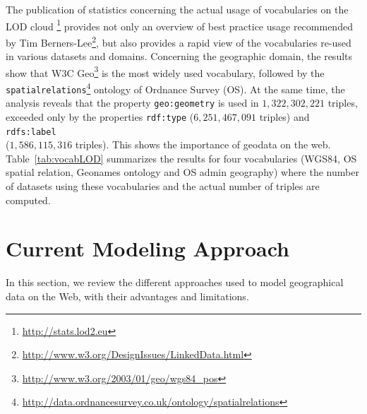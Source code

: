 The publication \cite{demter-2012-ekaw} of statistics concerning the actual usage of vocabularies on the LOD cloud \footnote{\url{http://stats.lod2.eu}} provides not only an overview of best practice usage recommended by Tim Berners-Lee\footnote{\url{http://www.w3.org/DesignIssues/LinkedData.html}}, but also provides a rapid view of the vocabularies re-used in various datasets and domains. Concerning the geographic domain, the results show that W3C Geo\footnote{\url{http://www.w3.org/2003/01/geo/wgs84_pos}} is the most widely used vocabulary, followed by the \texttt{spatialrelations}\footnote{\url{http://data.ordnancesurvey.co.uk/ontology/spatialrelations}} ontology of Ordnance Survey (OS). At the same time, the analysis reveals that the property \texttt{geo:geometry} is used in $1,322,302,221$ triples, exceeded only by the properties \texttt{rdf:type} ($6,251,467,091$ triples) and \texttt{rdfs:label}\\($1,586,115,316$ triples). This shows the importance of geodata on the web. Table~\ref{tab:vocabLOD} summarizes the results for four vocabularies (WGS84, OS spatial relation, Geonames ontology and OS admin geography) where the number of datasets using these vocabularies and the actual number of triples are computed.

\begin{table}[!htbp]
\end{table}

\section{Current Modeling Approach}
\label{sec:currentmodel}
In this section, we review the different approaches used to model geographical data on the Web, with their advantages and limitations.

